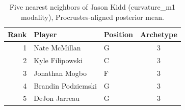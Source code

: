 \begin{table}[htbp]
  \centering\small
  \begin{tabular}{rllc}
    \toprule
    Rank & Player & Position & Archetype \\
    \midrule
    1 & Nate McMillan & G & 3 \\
    2 & Kyle Filipowski & C & 3 \\
    3 & Jonathan Mogbo & F & 3 \\
    4 & Brandin Podziemski & G & 3 \\
    5 & DeJon Jarreau & G & 3 \\
    \bottomrule
  \end{tabular}
  \caption{Five nearest neighbors of Jason Kidd (curvature_m1 modality), Procrustes-aligned posterior mean.}
  \label{tab:Jason_Kidd_neighbors_curvature_m1}
\end{table}

